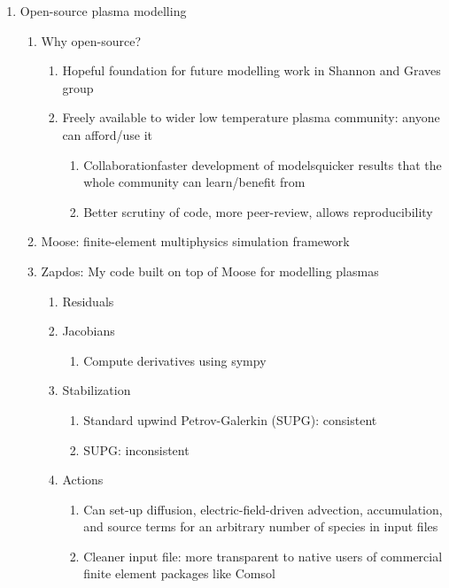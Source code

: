 \documentclass{article}
\begin{document}
\begin{enumerate}
  \item Open-source plasma modelling
  \begin{enumerate}
    \item Why open-source?
    \begin{enumerate}
      \item Hopeful foundation for future modelling work in Shannon and Graves group
      \item Freely available to wider low temperature plasma community: anyone can afford/use it
      \begin{enumerate}
        \item Collaboration\textrightarrow faster development of models\textrightarrow quicker results that the whole community can learn/benefit from
        \item Better scrutiny of code, more peer-review, allows reproducibility
      \end{enumerate}
    \end{enumerate}  
    \item Moose: finite-element multiphysics simulation framework
    \item Zapdos: My code built on top of Moose for modelling plasmas
    \begin{enumerate}
      \item Residuals
      \item Jacobians
      \begin{enumerate}
        \item Compute derivatives using sympy
      \end{enumerate}
      \item Stabilization
      \begin{enumerate}
        \item Standard upwind Petrov-Galerkin (SUPG): consistent
        \item SUPG: inconsistent
      \end{enumerate}
      \item Actions
      \begin{enumerate}
        \item Can set-up diffusion, electric-field-driven advection, accumulation, and source terms for an arbitrary number of species in input files
        \item Cleaner input file: more transparent to native users of commercial finite element packages like Comsol
      \end{enumerate}    
    \end{enumerate}
  \end{enumerate}  


\end{enumerate}
\end{document}
